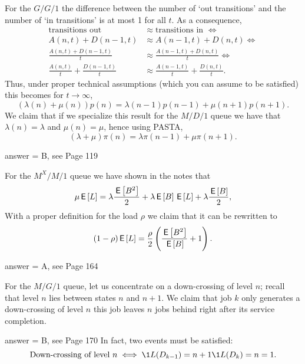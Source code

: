 \begin{exercise}[201807]{1} For the $G/G/1$ the difference between the number of `out
    transitions' and the number of `in transitions' is at most 1 for all $t$. As a consequence,
    \begin{align*}
\text{transitions out } &\approx \text{transitions in } \iff \\
      A(n,t) + D(n-1,t) &\approx A(n-1,t) + D(n,t)  \iff \\
      \frac{A(n,t) + D(n-1,t)}t &\approx \frac{A(n-1,t) + D(n, t)}t \iff \\
      \frac{A(n,t)}t + \frac{D(n-1,t)}t &\approx \frac{A(n-1,t)}t + \frac{D(n,t)}t.
    \end{align*}
Thus, under proper technical assumptions (which you can assume to be satisfied) this becomes for $t\to\infty$, 
\begin{equation*}
  (\lambda(n) +\mu(n))p(n) = \lambda(n-1)p(n-1) + \mu(n+1)p(n+1).
\end{equation*}
We claim that if we specialize this result for the $M/D/1$ queue we have that
$ \lambda(n) = \lambda$ and $\mu(n) = \mu$, hence using PASTA, 
\begin{equation*}
  (\lambda +\mu)\pi(n) = \lambda\pi(n-1) + \mu\pi(n+1).
\end{equation*}
\begin{solution}
answer = B, see Page 119
\end{solution}
\end{exercise}

\begin{exercise}[201807]{1}
For the $M^X/M/1$ queue we have shown in the notes that 
\begin{equation*}
  \mu \,\mathsf{E}\left[L\right] = \lambda \frac{\,\mathsf{E}\left[B^2\right]}2  + \lambda \,\mathsf{E}\left[B\right] \,\mathsf{E}\left[L\right] +\lambda \frac{\,\mathsf{E}\left[B\right]}2,
\end{equation*}
With a proper definition for the load  $\rho$ we claim that it can be rewritten to 
\begin{equation*}
(1- \rho) \,\mathsf{E}\left[L\right] = \frac \rho2 \left( \frac{\,\mathsf{E}\left[B^2\right]}{\,\mathsf{E}\left[B\right]} + 1\right).
\end{equation*}
\begin{solution}
answer = A, see Page 164
\end{solution}
\end{exercise}


\begin{exercise}[201807]{1}
For the $M/G/1$ queue, let us concentrate on a down-crossing of level $n$; recall that level $n$ lies between states $n$
and $n+1$.  We claim that job $k$  only generates a down-crossing of level $n$ this job  leaves $n$ jobs behind right after its service completion.
\begin{solution}
answer = B, see Page 170
In fact, two events must be satisfied: 
 \begin{equation*}
   \text{Down-crossing of level $n$} \iff \1{L(D_{k-1}) = n+1}\1{L(D_k)=n} = 1.
 \end{equation*}
\end{solution}
\end{exercise}

